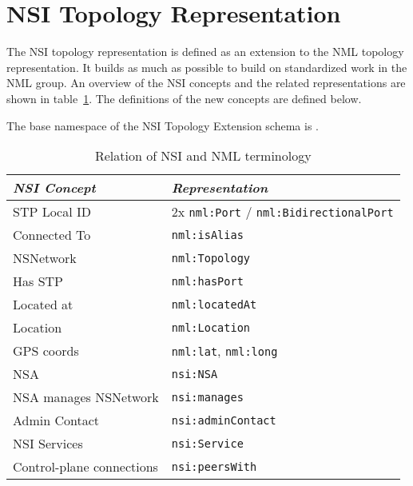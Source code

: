 \documentclass[12pt]{article}  %
\begin{document}
\section{NSI Topology Representation} %
\label{sub:nsi_topology_representation}

 The NSI topology representation is defined as an extension to the NML topology 
representation. It builds as much as possible to build on standardized work in the NML group.
An overview of the NSI concepts and the related representations are shown in table~\ref{tab:nsi-nml}.
The definitions of the new concepts are defined below.

The base namespace of the NSI Topology Extension schema is .

\begin{table}
\begin{center}

  \begin{tabular}{|l|l|}
\hline
     \textit{NSI Concept} &                               \textit{Representation}\\
\hline
             STP Local ID & 2x \texttt{nml:Port} / \texttt{nml:BidirectionalPort}\\
\hline
             Connected To &                                  \texttt{nml:isAlias}\\
\hline
                NSNetwork &                                 \texttt{nml:Topology}\\
\hline
                  Has STP &                                  \texttt{nml:hasPort}\\
\hline
               Located at &                                \texttt{nml:locatedAt}\\
\hline
                 Location &                                 \texttt{nml:Location}\\
\hline
               GPS coords &                   \texttt{nml:lat}, \texttt{nml:long}\\
\hline
                      NSA &                                      \texttt{nsi:NSA}\\
\hline
    NSA manages NSNetwork &                                  \texttt{nsi:manages}\\
\hline
            Admin Contact &                             \texttt{nsi:adminContact}\\
\hline
             NSI Services &                                  \texttt{nsi:Service}\\
\hline
Control-plane connections &                                \texttt{nsi:peersWith}\\
\hline
\end{tabular}
\caption{Relation of NSI and NML terminology}\label{tab:nsi-nml}
  \end{center}
\end{table}
\end{document}
